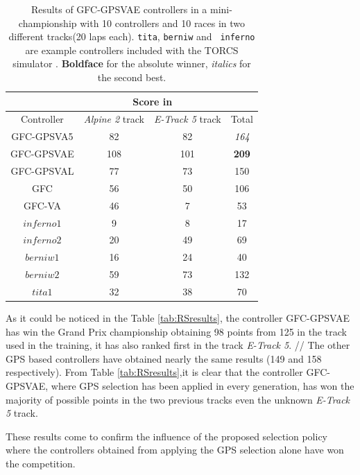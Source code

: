 \documentclass[10pt,journal,compsoc]{IEEEtran}
\begin{document}
%
\begin{table}[ht]
	\centering
	{\scriptsize
          \caption{ Results of {\sf GFC-GPSVAE} controllers in a mini-championship with 10 controllers and 10
            races in two different tracks(20 laps each). {\tt tita}, {\tt berniw} and {\tt
              inferno} are example controllers included with the TORCS
            simulator \cite{torcs4}. {\bf Boldface}
            for the absolute winner, {\em italics} for the second
            best.}
          {
            \begin{tabular}{|c|c|c||c|}
              \hline
              & \multicolumn{2}{|c|}{Score in} & \\
              \hline
              Controller& \textit{Alpine 2} track & \textit{E-Track 5} track &Total\\
              \hline
              \hline	
              {\sf GFC-GPSVA5} \cite{DBLP:conf/cig/SalemMG19}&	82&	82&	{\em 164}\\
              {\sf GFC-GPSVAE} &	108&    101&	{\bf 209}\\
				{\sf GFC-GPSVAL} \cite{DBLP:conf/cig/SalemMG19}&	77&	73&	150\\
				{\sf GFC}  \cite{salem_cig2018}&	56&	50&	106\\
				{\sf GFC-VA} \cite{DBLP:conf/cig/SalemMG19}&	46&	7&	53\\
				$inferno1$&	9&	8&	17\\
				$inferno2$&	20&	49&	69\\
				$berniw1$&	16&	24&	40\\
				$berniw2$&	59&	73&	132\\
				$tita1$&	32&	38&	70\\			
				\hline
				
			\end{tabular}
		}\label{tab:VaryingalphaRSresults}
	}
\end{table}
%
As it could be noticed in the Table \ref{tab:RSresults}, the controller {\sf GFC-GPSVAE} has win the Grand Prix championship obtaining 98 points from 125 in the track used in the training, it has also ranked first in the track  \textit{E-Track 5}. //
The other GPS based controllers have obtained nearly the same results (149 and 158 respectively).
From Table \ref{tab:RSresults},it is clear that the controller {\sf GFC-GPSVAE}, where GPS selection has been applied in every generation, has won the majority of possible points in the two previous tracks even the unknown \textit{E-Track 5}  track.

These results come to confirm the influence of the proposed selection policy where the controllers obtained from applying the GPS selection alone have won the competition.
 
\end{document}
